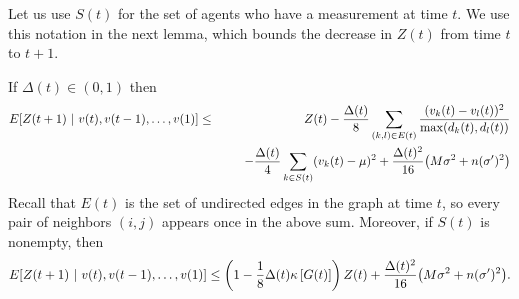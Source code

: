 \documentclass[final]{siamltex}
\begin{document}
Let us use $S(t)$ for the set of agents who have a measurement at time $t$. We use this notation in the   next lemma, which 
bounds the decrease in $Z({{{t}}})$ from time $t$ to $t+1$.

\smallskip

\begin{lemma} \label{lemma:measurementdecrease} If $\Delta(t) \in (0,1)$ then 
\begin{eqnarray*}
E[Z({{{t+1}}}) ~ {\bf | }~ v(t), {{{v(t-1), \ldots, v(1)}}}] & \leq & Z({{{t}}}) - \frac{\Delta(t)}{{{{8}}}} \sum_{(k,l) \in E(t)} \frac{(v_k(t) - v_l(t))^2}{\max (d_k(t), d_l(t))}  \\ && ~~~~~-\frac{\Delta(t)}{4} \sum_{k \in S(t)} (v_k(t) - \mu)^2 +   \frac{\Delta(t)^2}{16} {{{ \left( M \sigma^2 + n (\sigma')^2 \right)}}} 
\end{eqnarray*} Recall that $E(t)$ is the set of undirected edges in the graph at time $t$, so every pair of neighbors $(i,j)$ appears once in the above sum. Moreover, if $S(t)$ is nonempty, then 
\[ E[Z({{{t+1}}}) ~ {\bf | }~ v(t), {{{v(t-1), \ldots, v(1)}}}] \leq \left( 1 - \frac{1}{8} \Delta(t) \kappa \left[ G(t) \right] \right) Z({{{t}}}) +  \frac{\Delta(t)^2}{16} {{{ \left( M\sigma^2 + n(\sigma')^2 \right)}}}. \]
\end{lemma}
\end{document}
